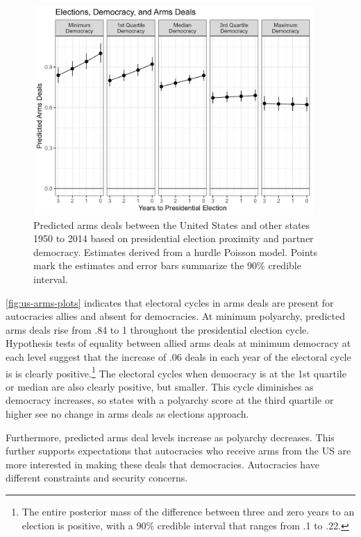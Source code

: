 \documentclass[12pt]{article}
\begin{document}
\begin{figure}[htpb]
	\centering
		\includegraphics[width=0.95\textwidth]{../figures/democ-deals-pred.png}
	\caption{Predicted arms deals between the United States and other states 1950 to 2014 based on presidential election proximity and partner democracy. Estimates derived from a hurdle Poisson model. Points mark the estimates and error bars summarize the 90\% credible interval.}
	\label{fig:democ-deals-pred}
\end{figure}


\autoref{fig:us-arms-plots} indicates that electoral cycles in arms deals are present for autocracies allies and absent for democracies.
At minimum polyarchy, predicted arms deals rise from .84 to 1 throughout the presidential election cycle.
Hypothesis tests of equality between allied arms deals at minimum democracy at each level suggest that the increase of .06 deals in each year of the electoral cycle is is clearly positive.\footnote{The entire posterior mass of the difference between three and zero years to an election is positive, with a 90\% credible interval that ranges from .1 to .22.}
The electoral cycles when democracy is at the 1st quartile or median are also clearly positive, but smaller.
This cycle diminishes as democracy increases, so states with a polyarchy score at the third quartile or higher see no change in arms deals as elections approach.  


Furthermore, predicted arms deal levels increase as polyarchy decreases. 
This further supports expectations that autocracies who receive arms from the US are more interested in making these deals that democracies. 
Autocracies have different constraints and security concerns. 
\end{document}
